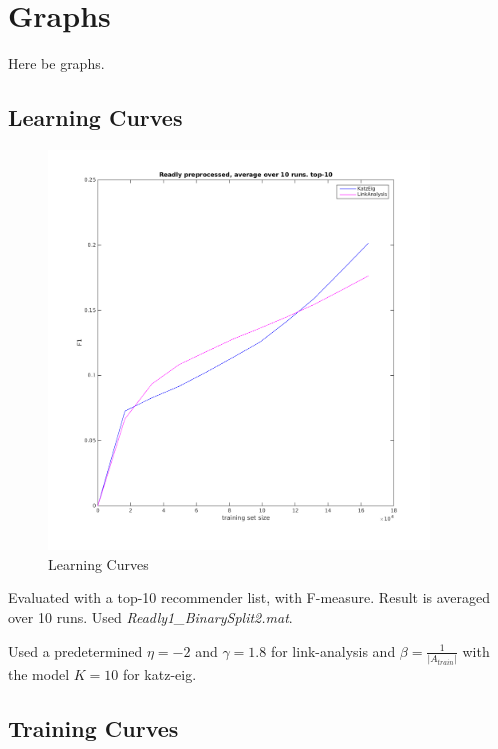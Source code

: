 \chapter{Graphs}\label{cha:graphs}

Here be graphs.

\section{Learning Curves}\label{sec:learning_curves}

\begin{figure}[h!]
  \centering
    \includegraphics[width=0.9\textwidth]{fig/readly_learning3.png}
  \caption{Learning Curves}
\end{figure}

\FloatBarrier

Evaluated with a top-10 recommender list, with F-measure. Result is averaged over 10 runs. Used \textit{Readly1\_BinarySplit2.mat}.

Used a predetermined $\eta = -2$ and $\gamma = 1.8$ for link-analysis and $\beta = \frac{1}{|A_{train}|}$ with the model $K = 10$ for katz-eig.


\section{Training Curves}\label{sec:training_curves}




